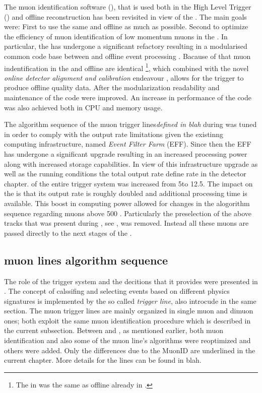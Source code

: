 
The muon identification software \cite{LHCb-PUB-2009-013,LHCb-PUB-2010-002} (\muonID),
that is used both in the High Level Trigger (\hlt) \cite{LHCb-PUB-2011-017} and offline reconstruction has been
revisited in view of the \lhc \runtwo. The main goals were: First to use the same \muonID and offline as much as
possible. Second to optimize the efficiency of muon identification of low momentum muons in the \hlt.
In particular, the \muonID has undergone a significant refactory resulting in a modularised common code base
between \hlt and offline event processing \cite{kevinThesis}. Bacause of that
muon indentification in the \hltone and offline are identical \footnote{The \muonID in \hlttwo was the same as offline already in \runone.},
which combined with the novel {\it online detector alignment and calibration} endeavour \cite{Aaij:2016rxn,LHCb-PROC-2015-024},  allows for the trigger
to produce offline quality data. After the modularization readability and maintenance of the code were improved.
An increase in performance of the \muonID code was also achieved both in CPU and memory usage.

The algorithm sequence of the \hltone muon trigger lines{\it defined in blah} during \runone was tuned in order to
comply with the output rate limitations given the existinng computing infrastructure,
named {\it Event Filter Farm} (EFF). Since then the EFF has undergone a significant upgrade resulting in an
increased processing power along with increased storage capabilities. In view of this infrastructure upgrade
as well as the \runtwo \lhc running conditions the total output rate{\color{red} define rate in the detector chapter.} of the entire trigger system was increased
from 5\khz to 12.5\khz. The impact on the \hltone is that its output rate is roughly doubled and additional processing time is available.
This boost in computing power allowed for changes in the \muonID alogorithm sequence regarding muons above 500 \mevc.
Particularly the preselection of the above tracks that was present during \runone, see ,
was removed. Instead all these muons are passed directly to the next stages of the \muonID.

\subsection{\hltone muon lines algorithm sequence}
\label{hlt1run2}

The role of the trigger system and the decitions that it provides were presented in \secref{}.
The concept of calssifing and selecting events based on different physics signatures is implemented by
the so called {\it trigger line}, also introcude in the same section. The \hltone muon trigger lines are
mainly organized in single muon and dimuon ones; both exploit the same muon identification procedure which
is described in the current subsection. Between \runone and \runtwo, as mentioned earlier, both muon identification
and also some of the muon line's algorithms were reoptimized and others were added. Only the differences due
to the MuonID are underlined in the current chapter. { More details for the lines can be found in blah.}

